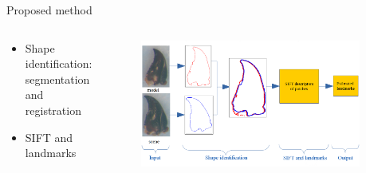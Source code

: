 \documentclass{LaBRI_poster}
\begin{document}
\begin{frame}[t]
\begin{columns}[t]
\begin{column}{\onecolwidth}
\begin{block}{Proposed method}
\begin{columns}[t]
\begin{column}{\threecolwidth}
\begin{itemize}
  					\begin{itemize}
  						\item Shape identification: segmentation and registration
  						\item SIFT and landmarks
  					\end{itemize}
  					
  					~\\[0.5cm]
			\end{itemize}
			
		\end{column}
		\begin{column}{\twothirdcolwidth}
			\begin{figure}
				\includegraphics[scale=.85]{images/method2}
			\end{figure}
		\end{column}
	\end{columns}
	\vspace{0.2cm}
\end{block}
\end{column}

  		
	



\begin{column}{\sepwidth}\end{column} %


\end{columns}
\end{frame}
\end{document}
